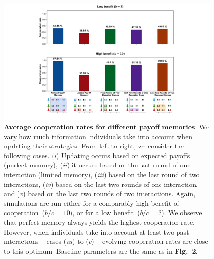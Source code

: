 \documentclass[11pt]{article}
\newcommand{\FigDependenceParameters}{{\bf Fig.~2}}
\theoremstyle{plainCl1}
\theoremstyle{plainCl2}
\begin{document}
\begin{figure}[t]
  \centering
  \includegraphics[width=\textwidth]{static/more_memory_summary_results.pdf}
  \caption{{\bf Average cooperation rates for different payoff memories.}
  We vary how much information individuals take into account when updating their strategies. 
  From left to right, we consider the following cases.
  ({\it i}) Updating occurs based on expected payoffs (perfect memory), 
  ({\it ii}) it occurs based on the last round of one interaction (limited memory), 
  ({\it iii}) based on the last round of two interactions,
  ({\it iv}) based on the last two rounds of one interaction, and 
  ({\it v}) based on the last two rounds of two interactions. 
  Again, simulations are run either for a comparably high benefit of cooperation~($b/c\!=\!10$), or for a low benefit~($b/c\!=\!3$). 
  We observe that perfect memory always yields the highest cooperation rate. 
  However, when individuals take into account at least two past interactions -- cases ({\it iii}) to ({\it v}) -- evolving cooperation rates are close to this optimum. 
  Baseline parameters are the same as in \FigDependenceParameters.}
\label{fig:cooperation_rate_all_updating_payoffs}
\end{figure}
\end{document}
